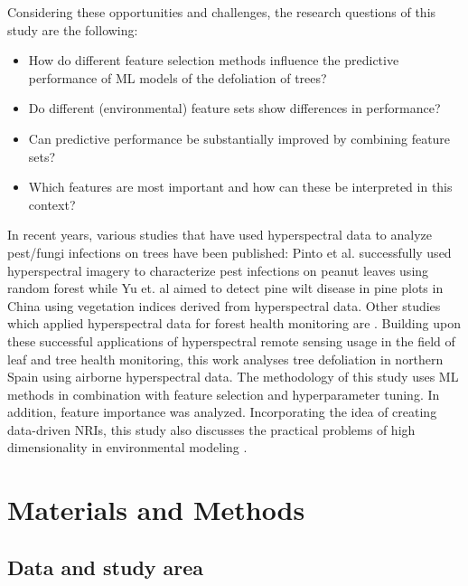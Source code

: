 \documentclass[remotesensing,article,submit,moreauthors,pdftex]{Definitions/mdpi}
\begin{document}
Considering these opportunities and challenges, the research questions of this study are the following:

\begin{itemize}

	\item How do different feature selection methods influence the predictive performance of ML models of the defoliation of trees?

	\item Do different (environmental) feature sets show differences in performance?

	\item Can predictive performance be substantially improved by combining feature sets?

	\item Which features are most important and how can these be interpreted in this context?

\end{itemize}

In recent years, various studies that have used hyperspectral data to analyze pest/fungi infections on trees have been published:
Pinto et al. \citep{pinto2020} successfully used hyperspectral imagery to characterize pest infections on peanut leaves using random forest while Yu et. al \cite{yu2021} aimed to detect pine wilt disease in pine plots in China using vegetation indices derived from hyperspectral data.
Other studies which applied hyperspectral data for forest health monitoring are \cite{lin2014,kayet2019,dash2017}.
Building upon these successful applications of hyperspectral remote sensing usage in the field of leaf and tree health monitoring, this work analyses tree defoliation in northern Spain using airborne hyperspectral data.
The methodology of this study uses ML methods in combination with feature selection and hyperparameter tuning.
In addition, feature importance was analyzed.
Incorporating the idea of creating data-driven \ac{NRI}s, this study also discusses the practical problems of high dimensionality in environmental modeling \cite{trunk1979, xu2016}.

\section{Materials and Methods}

\subsection{Data and study area}
\end{document}
